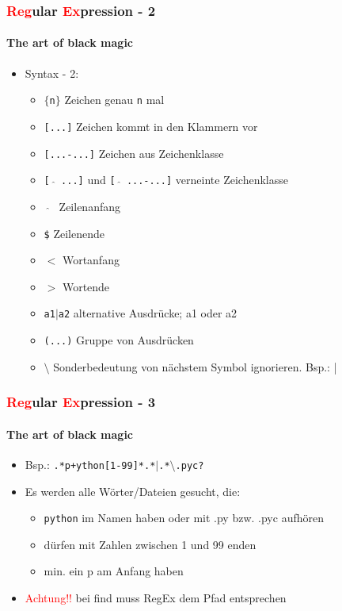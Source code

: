 \documentclass[12pt,utf8, handout]{beamer}
\begin{document}
\begin{frame}
\frametitle{\textcolor{red}{Reg}ular \textcolor{red}{Ex}pression - 2}
\framesubtitle{\textcolor{ownDarkOr}{The art of black magic}}
\begin{itemize}
	\item Syntax - 2:
	\begin{itemize}
		\item {\scriptsize \texttt{$\{$n$\}$} Zeichen genau \texttt{n} mal}
		\item {\scriptsize \texttt{[...]} Zeichen kommt in den Klammern vor}
		\item {\scriptsize \texttt{[...-...]} Zeichen aus Zeichenklasse}
		\item {\scriptsize \texttt{[ $\hat{}$ ...]} und \texttt{[ $\hat{}$ ...-...]} verneinte Zeichenklasse}
		\item {\scriptsize \texttt{ $\hat{}$ } Zeilenanfang}
		\item {\scriptsize \texttt{\$} Zeilenende}
		\item {\scriptsize \texttt{$<$} Wortanfang}
		\item {\scriptsize \texttt{$>$} Wortende}
		\item {\scriptsize \texttt{a1$\mid$a2} alternative Ausdrücke; a1 oder a2}
		\item {\scriptsize \texttt{(...)} Gruppe von Ausdrücken}
		\item {\scriptsize \texttt{$\setminus$} Sonderbedeutung von nächstem Symbol ignorieren. Bsp.: |}
	\end{itemize}
\end{itemize}
\end{frame}

\begin{frame}
\frametitle{\textcolor{red}{Reg}ular \textcolor{red}{Ex}pression - 3}
\framesubtitle{\textcolor{ownDarkOr}{The art of black magic}}
\begin{itemize}
	\item Bsp.: \texttt{.*p+ython[1-99]*.*$\mid$.*$\setminus$.pyc?}
	\item Es werden alle Wörter/Dateien gesucht, die:
	\begin{itemize}
		\item \texttt{python} im Namen haben oder mit .py bzw. .pyc aufhören
		\item dürfen mit Zahlen zwischen 1 und 99 enden
		\item min. ein p am Anfang haben
	\end{itemize}
	\item \textcolor{red}{Achtung!!} bei find muss RegEx dem Pfad entsprechen
\end{itemize}
\end{frame}
\end{document}
